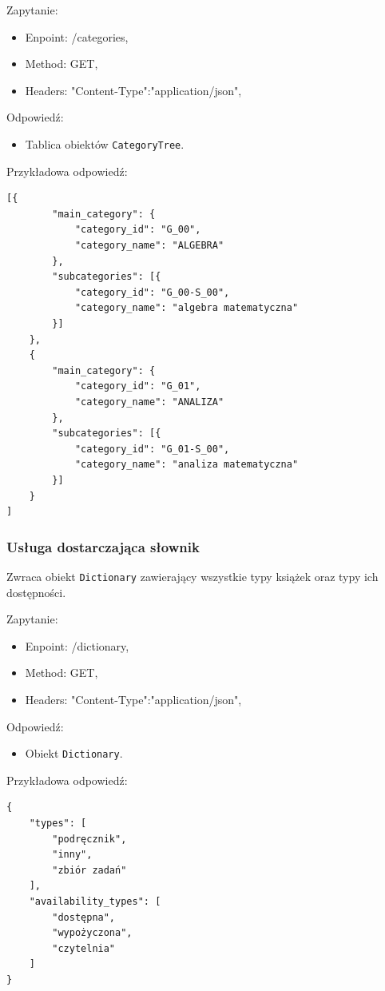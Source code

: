 \documentclass[twoside]{projektInzynierskiMS}
\begin{document}
Zapytanie:
\begin{itemize}
	\item Enpoint: /categories,
	\item Method: GET,
	\item Headers: "Content-Type":"application/json",
\end{itemize}

Odpowiedź:
\begin{itemize}
	\item Tablica obiektów \verb`CategoryTree`.
\end{itemize}

Przykładowa odpowiedź:

\begin{verbatim}
[{
        "main_category": {
            "category_id": "G_00",
            "category_name": "ALGEBRA"
        },
        "subcategories": [{
            "category_id": "G_00-S_00",
            "category_name": "algebra matematyczna"
        }]
    },
    {
        "main_category": {
            "category_id": "G_01",
            "category_name": "ANALIZA"
        },
        "subcategories": [{
            "category_id": "G_01-S_00",
            "category_name": "analiza matematyczna"
        }]
    }
]
\end{verbatim}


\subsubsection{Usługa dostarczająca słownik}
Zwraca obiekt \verb`Dictionary` zawierający wszystkie typy książek oraz typy ich dostępności.

Zapytanie:
\begin{itemize}
	\item Enpoint: /dictionary,
	\item Method: GET,
	\item Headers: "Content-Type":"application/json",
\end{itemize}

Odpowiedź:
\begin{itemize}
	\item Obiekt \verb`Dictionary`.
\end{itemize}

Przykładowa odpowiedź:

\begin{verbatim}
{
    "types": [
        "podręcznik",
        "inny",
        "zbiór zadań"
    ],
    "availability_types": [
        "dostępna",
        "wypożyczona",
        "czytelnia"
    ]
}
\end{verbatim}
\end{document}
